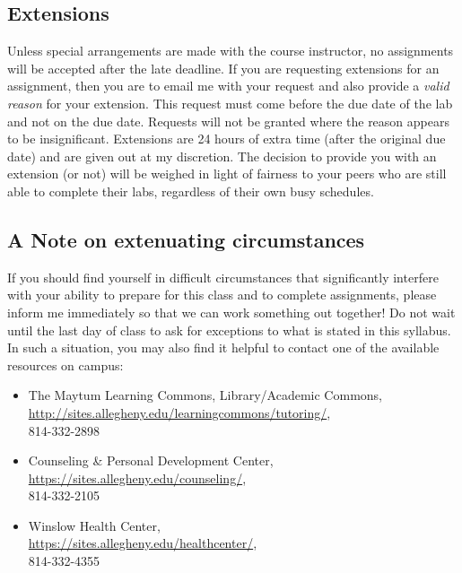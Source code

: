 \documentclass[11pt]{article} %
\begin{document}
\subsection*{\textbf{Extensions}}
Unless special arrangements are made with the course instructor, no assignments will be accepted after the late deadline. If you are requesting extensions for an assignment, then you are to email me with your request and also provide a \emph{valid reason} for your extension. This request must come before the due date of the lab and not on the due date. Requests will not be granted where the reason appears to be insignificant. Extensions are 24 hours of extra time (after the original due date) and are given out at my discretion. The decision to provide you with an extension (or not) will be weighed in light of fairness to your peers who are still able to complete their labs, regardless of their own busy schedules. 

\vspace{-.10in}
\subsection*{\textbf{A Note on extenuating circumstances}}

If you should find yourself in difficult circumstances that significantly interfere with your ability to prepare for this class and to complete assignments, please inform me immediately so that we can work something out together! Do not wait until the last day of class to ask for exceptions to what is stated in this syllabus. In such a situation, you may also find it helpful to contact one of the available resources on campus: 
\begin{itemize}
	\item The Maytum Learning Commons, Library/Academic Commons,\\ \url{http://sites.allegheny.edu/learningcommons/tutoring/},\\ 814-332-2898

	\item Counseling \& Personal Development Center,\\ \url{https://sites.allegheny.edu/counseling/},\\ 814-332-2105
	\item Winslow Health Center,\\ \url{https://sites.allegheny.edu/healthcenter/},\\ 814-332-4355
\end{itemize}
\end{document}

